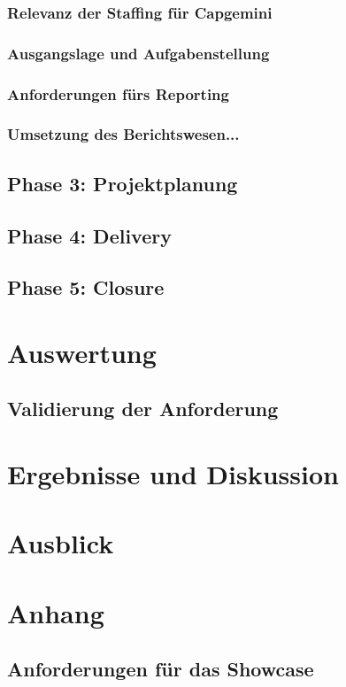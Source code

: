 \documentclass[a4paper, 12pt]{scrartcl}
\begin{document}
	\subsubsection{Relevanz der Staffing für Capgemini}%
	\subsubsection{Ausgangslage und Aufgabenstellung}
	\subsubsection{Anforderungen fürs Reporting}
	\subsubsection{Umsetzung des Berichtswesen...}
	\newpage
	\subsection{Phase 3: Projektplanung}
	\newpage
	\subsection{Phase 4: Delivery}
	\newpage
	\subsection{Phase 5: Closure}
	\newpage
	\section{Auswertung}
	\subsection{Validierung der Anforderung}%
	\newpage
	\section{Ergebnisse und Diskussion}
		\newpage
	\section{Ausblick}

		\newpage
	\section{Anhang}
	
	
	\subsection{Anforderungen für das Showcase}
\end{document}
